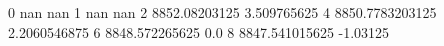 0 nan nan
1 nan nan
2 8852.08203125 3.509765625
4 8850.7783203125 2.2060546875
6 8848.572265625 0.0
8 8847.541015625 -1.03125
